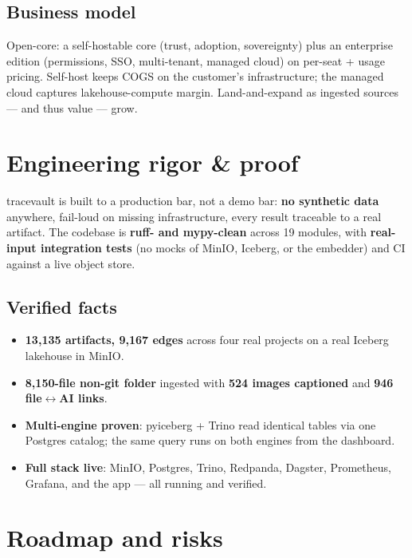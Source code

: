 \documentclass[11pt]{article}
\begin{document}
\subsection{Business model}
Open-core: a self-hostable core (trust, adoption, sovereignty) plus an enterprise edition
(permissions, SSO, multi-tenant, managed cloud) on per-seat + usage pricing. Self-host keeps COGS on
the customer's infrastructure; the managed cloud captures lakehouse-compute margin. Land-and-expand as
ingested sources --- and thus value --- grow.

\section{Engineering rigor \& proof}

tracevault is built to a production bar, not a demo bar: \textbf{no synthetic data} anywhere,
fail-loud on missing infrastructure, every result traceable to a real artifact. The codebase is
\textbf{ruff- and mypy-clean} across 19 modules, with \textbf{real-input integration tests} (no mocks
of MinIO, Iceberg, or the embedder) and CI against a live object store.

\subsection{Verified facts}
\begin{itemize}[leftmargin=1.4em,itemsep=2pt]
  \item \textbf{13{,}135 artifacts, 9{,}167 edges} across four real projects on a real Iceberg
  lakehouse in MinIO.
  \item \textbf{8{,}150-file non-git folder} ingested with \textbf{524 images captioned} and
  \textbf{946 file$\leftrightarrow$AI links}.
  \item \textbf{Multi-engine proven}: pyiceberg + Trino read identical tables via one Postgres
  catalog; the same query runs on both engines from the dashboard.
  \item \textbf{Full stack live}: MinIO, Postgres, Trino, Redpanda, Dagster, Prometheus, Grafana, and
  the app --- all running and verified.
\end{itemize}

\section{Roadmap and risks}
\end{document}
